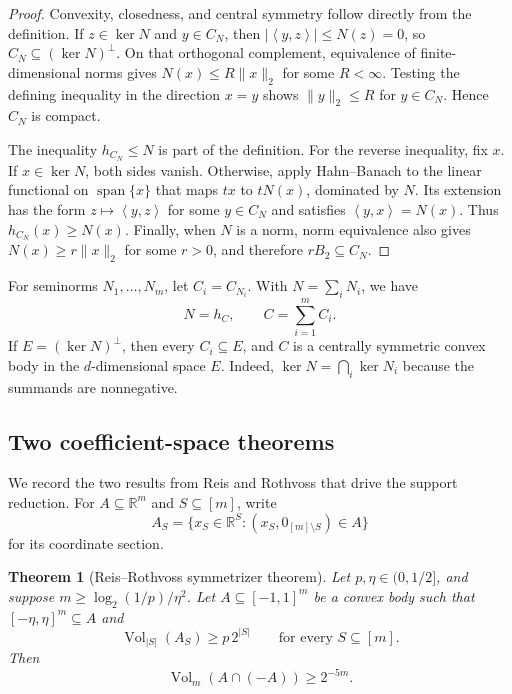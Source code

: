 \documentclass[11pt]{article}
\newtheorem{theorem}{Theorem}[section]
\theoremstyle{remark}
\newcommand{\R}{\mathbb{R}}
\newcommand{\Vol}{\operatorname{Vol}}
\newcommand{\ip}[2]{\left\langle #1,#2\right\rangle}
\begin{document}
\begin{proof}
Convexity, closedness, and central symmetry follow directly from the
definition.  If $z\in\ker N$ and $y\in C_N$, then
$|\ip{y}{z}|\leq N(z)=0$, so $C_N\subseteq(\ker N)^\perp$.  On that
orthogonal complement, equivalence of finite-dimensional norms gives
$N(x)\leq R\|x\|_2$ for some $R<\infty$.  Testing the defining
inequality in the direction $x=y$ shows $\|y\|_2\leq R$ for
$y\in C_N$.  Hence $C_N$ is compact.

The inequality $h_{C_N}\leq N$ is part of the definition.  For the
reverse inequality, fix $x$.  If $x\in\ker N$, both sides vanish.
Otherwise, apply Hahn--Banach to the linear functional on
$\operatorname{span}\{x\}$ that maps $tx$ to $tN(x)$, dominated by
$N$.  Its extension has the form $z\mapsto\ip{y}{z}$ for some
$y\in C_N$ and satisfies $\ip{y}{x}=N(x)$.  Thus $h_{C_N}(x)\geq
N(x)$.  Finally, when $N$ is a norm, norm equivalence also gives
$N(x)\geq r\|x\|_2$ for some $r>0$, and therefore
$rB_2\subseteq C_N$.
\end{proof}

For seminorms $N_1,\ldots,N_m$, let $C_i=C_{N_i}$.  With
$N=\sum_iN_i$, we have
\begin{equation}\label{eq:support-sum}
  N=h_C,\qquad C=\sum_{i=1}^m C_i.
\end{equation}
If $E=(\ker N)^\perp$, then every $C_i\subseteq E$, and $C$ is a
centrally symmetric convex body in the $d$-dimensional space $E$.
Indeed, $\ker N=\bigcap_i\ker N_i$ because the summands are
nonnegative.

\subsection{Two coefficient-space theorems}

We record the two results from Reis and Rothvoss that drive the support
reduction.  For $A\subseteq\R^m$ and $S\subseteq[m]$, write
\[
  A_S=\{x_S\in\R^S:(x_S,0_{[m]\setminus S})\in A\}
\]
for its coordinate section.

\begin{theorem}[Reis--Rothvoss symmetrizer theorem]\label{thm:RR-symmetrizer}
Let $p,\eta\in(0,1/2]$, and suppose
$m\geq\log_2(1/p)/\eta^2$.  Let $A\subseteq[-1,1]^m$ be a convex body
such that $[-\eta,\eta]^m\subseteq A$ and
\[
  \Vol_{|S|}(A_S)\geq p\,2^{|S|}
  \qquad\text{for every }S\subseteq[m].
\]
Then
\[
  \Vol_m(A\cap(-A))\geq2^{-5m}.
\]
\end{theorem}
\end{document}
